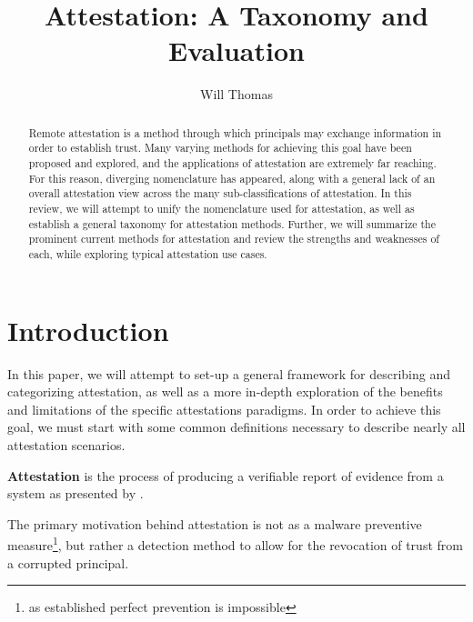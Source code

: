 \documentclass[acmsmall]{acmart}
\theoremstyle{definition}
\newcommand{\defn}[2]{
  \begin{flushleft}
  \begin{definition}[\textbf{#1}]\label{defn:#1}
    #2
  \end{definition}
  \end{flushleft}
}
\begin{document}
%
\title{Attestation: A Taxonomy and Evaluation}
%
%
%
\author[W. Thomas]{Will Thomas}
%
\begin{abstract}
  Remote attestation is a method through which
  principals may exchange information in order
  to establish trust. Many varying methods
  for achieving this goal have been proposed and explored,
  and the applications of attestation are extremely far reaching.
  For this reason, diverging nomenclature has appeared, along
  with a general lack of an overall attestation view across
  the many sub-classifications of attestation.
  In this review, we will attempt to unify the nomenclature used
  for attestation, as well as establish a general taxonomy for attestation
  methods. Further, we will summarize the prominent current
  methods for attestation and review the strengths and
  weaknesses of each, while exploring typical attestation use cases.
\end{abstract}

\maketitle              %
%
%
%
\section{Introduction}

In this paper, we will attempt to set-up a general framework for
describing and categorizing attestation, as well as a more in-depth
exploration of the benefits and limitations of the specific attestations paradigms.
In order to achieve this goal, we must start with some common definitions necessary
to describe nearly all attestation scenarios.

\defn{Attestation}{
  \textbf{Attestation} is the process of producing a verifiable report of evidence from a system
  as presented by \citet{Sadeghi:04:Property-based-, Haldar:04:Semantic-Remote,Coker::Principles-of-R}.

  The primary motivation behind attestation is not as a
  malware preventive measure\footnote{as \citet{Loscocco:98:The-Inevitabili} established perfect prevention is impossible}, 
  but rather a detection method to allow for the revocation of trust
  from a corrupted principal.
}
\end{document}
